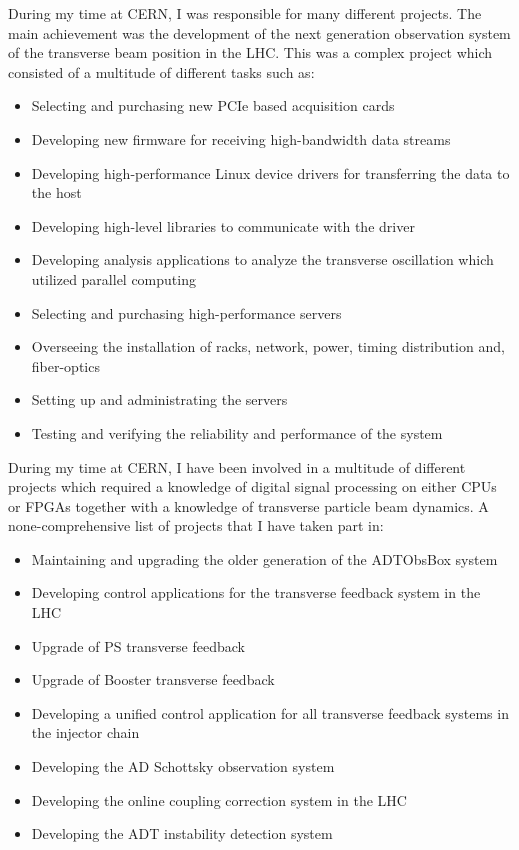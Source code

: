 \documentclass[left=2.5cm,top=2cm,right=2.5cm,bottom=2.5cm]{cv-style}
\begin{document}
During my time at CERN, I was responsible for many different projects. The main achievement was the development of the next generation observation system of the transverse beam position in the LHC. This was a complex project which consisted of a multitude of different tasks such as:
\begin{itemize}
 \setlength{\itemsep}{3pt}
    \setlength{\parskip}{0pt}
    \setlength{\parsep}{0pt} 
\item Selecting and purchasing new PCIe based acquisition cards
\item Developing new firmware for receiving high-bandwidth data streams
\item Developing high-performance Linux device drivers for transferring the data to the host
\item Developing high-level libraries to communicate with the driver
\item Developing analysis applications to analyze the transverse oscillation which utilized parallel computing
\item Selecting and purchasing high-performance servers
\item Overseeing the installation of racks, network, power, timing distribution and, fiber-optics
\item Setting up and administrating the servers
\item Testing and verifying the reliability and performance of the system 
\end{itemize}
During my time at CERN, I have been involved in a multitude of different projects which required a knowledge of digital signal processing on either CPUs or FPGAs together with a knowledge of transverse particle beam dynamics. 
A none-comprehensive list of projects that I have taken part in:
\begin{itemize}
 \setlength{\itemsep}{3pt}
    \setlength{\parskip}{0pt}
    \setlength{\parsep}{0pt} 
\item Maintaining and upgrading the older generation of the ADTObsBox system
\item Developing control applications for the transverse feedback system in the LHC
\item Upgrade of PS transverse feedback 
\item Upgrade of Booster transverse feedback
\item Developing a unified control application for all transverse feedback systems in the injector chain
\item Developing the AD Schottsky observation system
\item Developing the online coupling correction system in the LHC
\item Developing the ADT instability detection system
\end{itemize}
\end{document}
